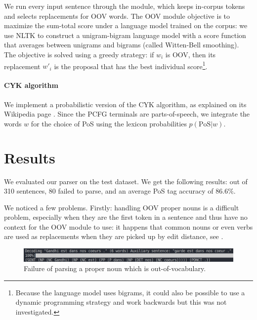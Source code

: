 \documentclass[11pt]{article}
\begin{document}
We run every input sentence through the module, which keeps in-corpus tokens and selects replacements for OOV words. The OOV module objective is to maximize the sum-total score under a language model trained on the corpus: we use NLTK to construct a unigram-bigram language model with a score function that averages between unigrams and bigrams (called Witten-Bell smoothing). The objective is solved using a greedy strategy: if $w_i$ is OOV, then its replacement $w'_i$ is the proposal that has the best individual score\footnote{Because the language model uses bigrams, it could also be possible to use a dynamic programming strategy and work backwards but this was not investigated.}.

\paragraph{CYK algorithm}

We implement a probabilistic version of the CYK algorithm, as explained on its Wikipedia page \cite{wiki:CYK}. Since the PCFG terminals are parts-of-speech, we integrate the words $w$ for the choice of PoS using the lexicon probabilities $p(\mathrm{PoS}|w)$.

\section{Results}


We evaluated our parser on the test dataset. We get the following results: out of 310 sentences, 80 failed to parse, and an average PoS tag accuracy of $86.6\%$.

We noticed a few problems. Firstly: handling OOV proper nouns is a difficult problem, especially when they are the first token in a sentence and thus have no context for the OOV module to use: it happens that common nouns or even verbs are used as replacements when they are picked up by edit distance, see .
\begin{figure}[ht!]
	\centering
	\includegraphics[width=\linewidth]{gandhi-garde.png}
	\caption{Failure of parsing a proper noun which is out-of-vocabulary.}
	\label{fig:npParseFailure_didiersoulage}
\end{figure}


\printbibliography{}
\end{document}
